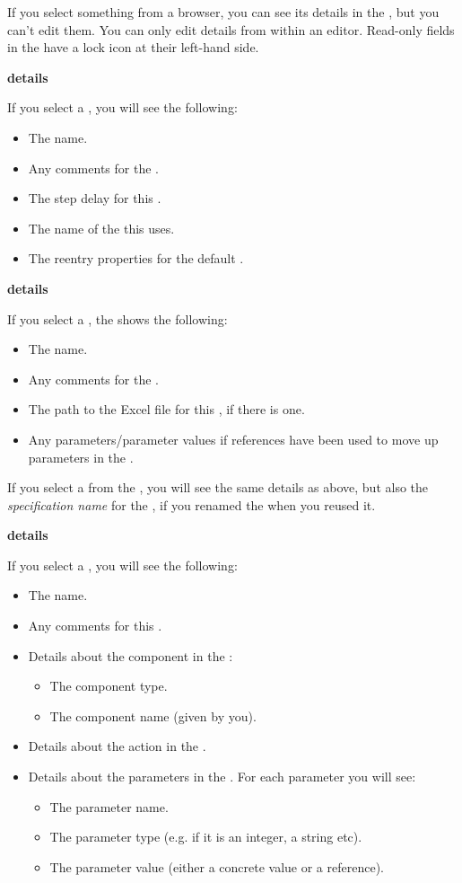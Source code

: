 If you select something from a browser, you can see its details in the \gdpropview{}, but you can't edit them. You can only edit details from within an editor. Read-only fields in the \gdpropview{} have a lock icon at their left-hand side. 

\textbf{\gdsuite{} details}

If you select a \gdsuite{}, you will see the following:
\begin{itemize}
\item The \gdsuite{} name.
\item Any comments for the \gdsuite{}. 
\item The step delay for this \gdsuite{}.
\item The name of the \gdaut{} this \gdsuite{} uses. 
\item The reentry properties for the default \gdehandlers{}. 
\end{itemize}

\textbf{\gdcase{} details}

If you select a \gdcase{}, the \gdpropview{} shows the following:

\begin{itemize}
\item The \gdcase{} name.
\item Any comments for the \gdcase{}. 
\item The path to the Excel file for this \gdcase{}, if there is one. 
\item Any parameters/parameter values if references have been used to move up parameters in the \gdcase{}. 
\end{itemize}

If you select a \gdcase{} from the \gdtestsuitebrowser{}, you will see the same details as above, but also the \emph{specification name} for the \gdcase{}, if you  renamed the \gdcase{} when you reused it. 


\textbf{\gdstep{} details}

If you select a \gdstep{}, you will see the following:
\begin{itemize}
\item The \gdstep{} name.
\item Any comments for this \gdstep{}. 
\item Details about the component in the \gdstep{}:
\begin{itemize}
\item  The component type.
\item  The component name (given by you).
\end{itemize}
\item Details about the action in the \gdstep{}.
\item Details about the parameters in the \gdstep{}. For each parameter you will see:
\begin{itemize}
\item The parameter name.
\item The parameter type (e.g. if it is an integer, a string etc).
\item The parameter value (either a concrete value or a reference). 
\end{itemize}
\end{itemize}

